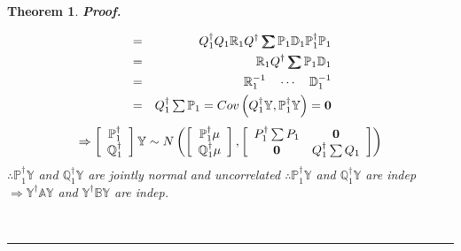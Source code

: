 \documentclass{article}
\newtheorem{theorem}{Theorem}
\newenvironment{proof}[1][Proof]{\noindent\textbf{#1.} }{\ \rule{0.5em}{0.5em}}
\begin{document}
\begin{theorem}
\begin{proof}
\begin{itemize}
\begin{eqnarray*}
&=&Q_{1}^{\dagger }Q_{1}\mathbb{R}_{1}Q^{\dagger }%
\tsum\mkern-20mu\tsum%
\mathbb{P}_{1}\mathbb{D}_{1}\mathbb{P}_{1}^{\dagger }\mathbb{P}_{1} \\
&=&\mathbb{R}_{1}Q^{\dagger }%
\tsum\mkern-20mu\tsum%
\mathbb{P}_{1}\mathbb{D}_{1} \\
&=&\mathbb{R}_{1}^{-1}\quad \cdots \quad \mathbb{D}_{1}^{-1} \\
&=&Q_{1}^{\dagger }\tsum \mathbb{P}_{1}=Cov\left( Q_{1}^{\dagger }\mathbb{Y},%
\mathbb{P}_{1}^{\dagger }\mathbb{Y}\right) =\boldsymbol{0}
\end{eqnarray*}%
\begin{equation*}
\Rightarrow \left[ 
\begin{array}{c}
\mathbb{P}_{1}^{\dagger } \\ 
\mathbb{Q}_{1}^{\dagger }%
\end{array}%
\right] \mathbb{Y}\sim N\left( \left[ 
\begin{array}{c}
\mathbb{P}_{1}^{\dagger }\mu  \\ 
\mathbb{Q}_{1}^{\dagger }\mu 
\end{array}%
\right] ,\left[ 
\begin{array}{cc}
P_{1}^{\dagger }\tsum P_{1} & \boldsymbol{0} \\ 
\boldsymbol{0} & Q_{1}^{\dagger }\tsum Q_{1}%
\end{array}%
\right] \right) 
\end{equation*}%
$\therefore \mathbb{P}_{1}^{\dagger }\mathbb{Y}$ and $\mathbb{Q}%
_{1}^{\dagger }\mathbb{Y}$ are jointly normal and uncorrelated\newline
\newline
$\therefore \mathbb{P}_{1}^{\dagger }\mathbb{Y}$ and $\mathbb{Q}%
_{1}^{\dagger }\mathbb{Y}$ are indep $\Rightarrow \mathbb{Y^{\dagger }AY}$
and $\mathbb{Y^{\dagger }BY}$ are indep.\newline
\newline


\end{itemize}
\end{proof}
\end{theorem}
\end{document}
